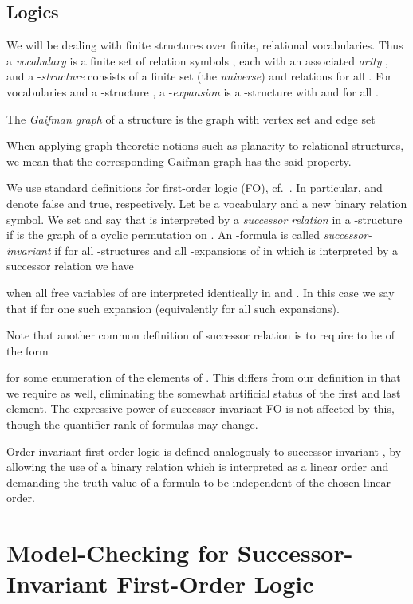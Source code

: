 \documentclass[12pt]{amsart}
\begin{document}
\subsection{Logics}
\label{sec:logicprelim}

We will be dealing with finite structures over finite, relational
vocabularies. Thus a \emph{vocabulary}  is a finite set of
relation symbols , each with an associated \emph{arity} , and
a -\emph{structure}  consists of a finite set  (the
\emph{universe}) and relations  for all . For vocabularies  and a
-structure , a -\emph{expansion}  is a
-structure with  and  for all .

The \emph{Gaifman graph} of a structure  is the graph with vertex
set  and edge set

When applying graph-theoretic notions such as planarity to relational
structures, we mean that the corresponding Gaifman graph has the said
property.

We use standard definitions for first-order logic (FO),
cf.~\cite{eft96,ebbflu99,lib04}. In particular,  and 
denote false and true, respectively. Let  be a vocabulary and
 a new binary relation symbol. We set
 and say that  is interpreted
by a \emph{successor relation} in a -structure  if
 is the graph of a cyclic permutation on . An
-formula  is called
\emph{successor-invariant} if for all -structures  and all
-expansions  of  in which  is interpreted
by a successor relation we have

when all free variables of  are interpreted identically in
 and . In this case we say that  if  for one such expansion  (equivalently for all such
expansions).

Note that another common definition of successor relation is to
require  to be of the form

for some enumeration  of the elements of
. This differs from our definition in that we require  as well, eliminating the somewhat artificial status of
the first and last element. The expressive power of
successor-invariant FO is not affected by this, though the quantifier
rank of formulas may change.

Order-invariant first-order logic is defined analogously to
successor-invariant , by allowing the use of a binary relation
 which is interpreted as a linear order and demanding the truth
value of a formula to be independent of the chosen linear order.



\section{Model-Checking for Successor-Invariant First-Order Logic}
\end{document}
